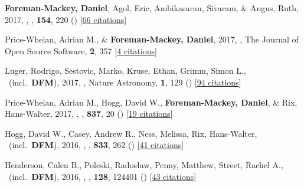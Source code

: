 \item[{\color{numcolor}\scriptsize28}] \textbf{Foreman-Mackey, Daniel}, Agol, Eric, Ambikasaran, Sivaram, \& Angus, Ruth, 2017, , \aj, \textbf{154}, 220 () [\href{http://adsabs.harvard.edu/abs/2017AJ....154..220F}{66 citations}]

\item[{\color{numcolor}\scriptsize27}] Price-Whelan, Adrian M., \& \textbf{Foreman-Mackey, Daniel}, 2017, , The Journal of Open Source Software, \textbf{2}, 357 [\href{http://adsabs.harvard.edu/abs/2017JOSS....2..357P}{4 citations}]

\item[{\color{numcolor}\scriptsize26}] Luger, Rodrigo, Sestovic, Marko, Kruse, Ethan, Grimm, Simon L., \etal\ (incl.\ \textbf{DFM}), 2017, , Nature Astronomy, \textbf{1}, 129 () [\href{http://adsabs.harvard.edu/abs/2017NatAs...1E.129L}{94 citations}]

\item[{\color{numcolor}\scriptsize25}] Price-Whelan, Adrian M., Hogg, David W., \textbf{Foreman-Mackey, Daniel}, \& Rix, Hans-Walter, 2017, , \apj, \textbf{837}, 20 () [\href{http://adsabs.harvard.edu/abs/2017ApJ...837...20P}{19 citations}]

\item[{\color{numcolor}\scriptsize24}] Hogg, David W., Casey, Andrew R., Ness, Melissa, Rix, Hans-Walter, \etal\ (incl.\ \textbf{DFM}), 2016, , \apj, \textbf{833}, 262 () [\href{http://adsabs.harvard.edu/abs/2016ApJ...833..262H}{41 citations}]

\item[{\color{numcolor}\scriptsize23}] Henderson, Calen B., Poleski, Rados{\l}aw, Penny, Matthew, Street, Rachel A., \etal\ (incl.\ \textbf{DFM}), 2016, , \pasp, \textbf{128}, 124401 () [\href{http://adsabs.harvard.edu/abs/2016PASP..128l4401H}{43 citations}]

